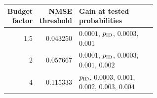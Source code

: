 \begin{tabular}{rrp{0.6\linewidth}}
\toprule
Budget factor & NMSE threshold & Gain at tested probabilities \\
\midrule
1.5 & 0.043250 & $0.0001$, $p_{\rm ID}$, $0.0003$, $0.001$ \\
2 & 0.057667 & $0.0001$, $p_{\rm ID}$, $0.0003$, $0.001$, $0.002$ \\
4 & 0.115333 & $p_{\rm ID}$, $0.0003$, $0.001$, $0.002$, $0.003$, $0.004$ \\
\bottomrule
\end{tabular}
